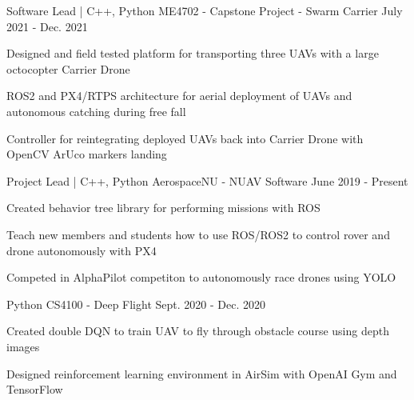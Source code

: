 
\begin{cventries}
  \cventry
    {Software Lead | C++, Python} %
    {ME4702 - Capstone Project - Swarm Carrier} %
    {} %
    {July 2021 - Dec. 2021} %
    {
      \begin{cvitems} %
        \item {Designed and field tested platform for transporting three UAVs with a large octocopter Carrier Drone}
        \item {ROS2 and PX4/RTPS architecture for aerial deployment of UAVs and autonomous catching during free fall}
        \item {Controller for reintegrating deployed UAVs back into Carrier Drone with OpenCV ArUco markers landing}
      \end{cvitems}
    }

  \cventry
    {Project Lead | C++, Python} %
    {AerospaceNU - NUAV Software} %
    {} %
    {June 2019 - Present} %
    {
      \begin{cvitems} %
        \item {Created behavior tree library for performing missions with ROS}
        \item {Teach new members and students how to use ROS/ROS2 to control rover and drone autonomously with PX4}
        \item {Competed in AlphaPilot competiton to autonomously race drones using YOLO}
      \end{cvitems}
    }

  \cventry
    {Python} %
    {CS4100 - Deep Flight} %
    {} %
    {Sept. 2020 - Dec. 2020} %
    {
      \begin{cvitems} %
        \item {Created double DQN to train UAV to fly through obstacle course using depth images}
        \item {Designed reinforcement learning environment in AirSim with OpenAI Gym and TensorFlow}
      \end{cvitems}
    }


\end{cventries}

